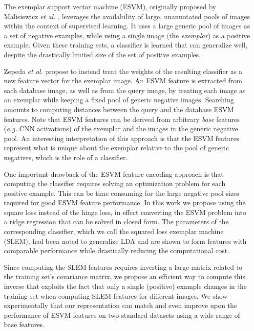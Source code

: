 The exemplar support vector machine (ESVM), originally proposed by Malisiewicz {\it et al.} \cite{Malisiewicza}, leverages the availability of large, unannotated pools of images within the context of supervised learning. It uses a large generic pool of images as a set of negative examples, while using a single image (the \emph{exemplar}) as a positive example. Given these training sets, a classifier is learned that can  generalize well, despite the drastically limited size of the set of positive examples.

Zepeda \emph{et al.} \cite{ZePe15} propose to instead treat the weights of the resulting classifier as a new feature vector for the exemplar image. %
An ESVM feature is extracted from each database image, as well as from the query image, by treating each image as an exemplar while keeping a fixed pool of generic negative images. Searching amounts to computing distances between the query and the database ESVM features. Note that ESVM features can be derived from arbitrary \emph{base} features ({\it e.g.} CNN activations) of the exemplar and the images in the generic negative pool. An interesting interpretation of this approach is that the ESVM features represent what is unique about the exemplar relative to the pool of generic negatives, which is the role of a classifier.


One important drawback of the ESVM feature encoding approach is that computing the  classifier requires solving an optimization problem for each positive example. This can be time consuming for the large negative pool sizes required for good ESVM feature performance. In this work we propose using the square loss instead of the hinge loss, in effect converting the ESVM problem into a ridge regression that can be solved in closed form. The parameters of the corresponding classifier, which we call the squared loss exemplar machine (SLEM), had been noted to generalize LDA \cite{Koba15} and are shown to form features with comparable performance while drastically reducing the computational cost.


Since computing the SLEM features requires inverting a large matrix related to the training set's covariance matrix, we propose an efficient way to compute this inverse that exploits the fact that only a single (positive) example changes in the training set when computing SLEM features for different images. We show experimentally that our representation can match and even improve upon the performance of ESVM features on two standard datasets using a wide range of base features.

